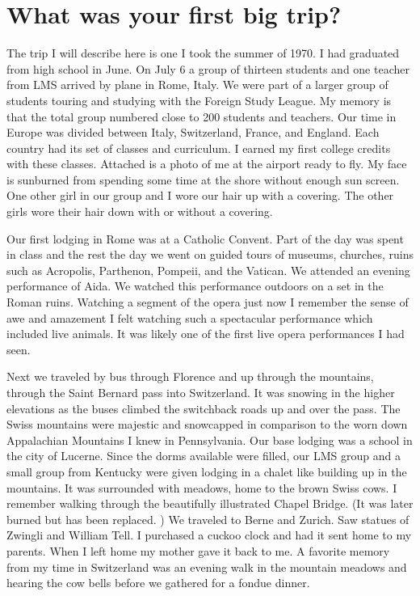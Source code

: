 \section{What was your first big trip?}
The trip I will describe here is one I took the summer of 1970.
I had graduated from high school in June.
On July 6 a group of thirteen students and one teacher from LMS arrived by plane in Rome, Italy.
We were part of a larger group of students touring and studying with the Foreign Study League.
My memory is that the total group numbered close to 200 students and teachers.
Our time in Europe was divided between Italy, Switzerland, France, and England.
Each country had its set of classes and curriculum.
I earned my first college credits with these classes.
Attached is a photo of me at the airport ready to fly.
My face is sunburned from spending some time at the shore without enough sun screen.
One other girl in our group and I wore our hair up with a covering.
The other girls wore their hair down with or without a covering.

Our first lodging in Rome was at a Catholic Convent.
Part of the day was spent in class and the rest the day we went on guided tours of museums, churches, ruins such as Acropolis, Parthenon, Pompeii, and the Vatican.
We attended an evening performance of Aida.
We watched this performance outdoors on a set in the Roman ruins.
Watching a segment of the opera just now I remember the sense of awe and amazement I felt watching such a spectacular performance which included live animals.
It was likely one of the first live opera performances I had seen.

Next we traveled by bus through Florence and up through the mountains, through the Saint Bernard pass into Switzerland.
It was snowing in the higher elevations as the buses climbed the switchback roads up and over the pass.
The Swiss mountains were majestic and snowcapped in comparison to the worn down Appalachian Mountains I knew in Pennsylvania.
Our base lodging was a school in the city of Lucerne.
Since the dorms available were filled, our LMS group and a small group from Kentucky were given lodging in a chalet like building up in the mountains.
It was surrounded with meadows, home to the brown Swiss cows.
I remember walking through the beautifully illustrated Chapel Bridge.
(It was later burned but has been replaced.
) We traveled to Berne and Zurich.
Saw statues of Zwingli and William Tell.
I purchased a cuckoo clock and had it sent home to my parents.
When I left home my mother gave it back to me.
A favorite memory from my time in Switzerland was an evening walk in the mountain meadows and hearing the cow bells before we gathered for a fondue dinner.

